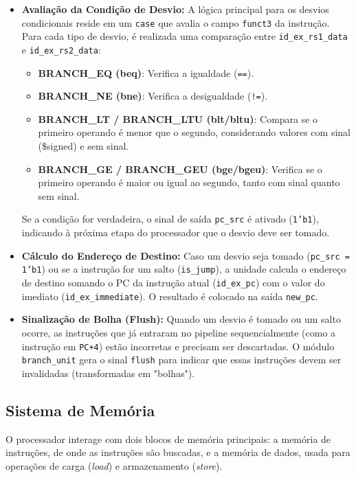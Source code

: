\documentclass[12pt]{article}
\begin{document}
\begin{itemize}
    \item \textbf{Avaliação da Condição de Desvio:} A lógica principal para os desvios condicionais reside em um \texttt{case} que avalia o campo \texttt{funct3} da instrução. Para cada tipo de desvio, é realizada uma comparação entre \texttt{id\_ex\_rs1\_data} e \texttt{id\_ex\_rs2\_data}:
    \begin{itemize}
        \item \textbf{BRANCH\_EQ (beq)}: Verifica a igualdade (\texttt{==}).
        \item \textbf{BRANCH\_NE (bne)}: Verifica a desigualdade (\texttt{!=}).
        \item \textbf{BRANCH\_LT / BRANCH\_LTU (blt/bltu)}: Compara se o primeiro operando é menor que o segundo, considerando valores com sinal (\$signed) e sem sinal.
        \item \textbf{BRANCH\_GE / BRANCH\_GEU (bge/bgeu)}: Verifica se o primeiro operando é maior ou igual ao segundo, tanto com sinal quanto sem sinal.
    \end{itemize}
    Se a condição for verdadeira, o sinal de saída \texttt{pc\_src} é ativado (\texttt{1'b1}), indicando à próxima etapa do processador que o desvio deve ser tomado.

    \item \textbf{Cálculo do Endereço de Destino:} Caso um desvio seja tomado (\texttt{pc\_src = 1'b1}) ou se a instrução for um salto (\texttt{is\_jump}), a unidade calcula o endereço de destino somando o PC da instrução atual (\texttt{id\_ex\_pc}) com o valor do imediato (\texttt{id\_ex\_immediate}). O resultado é colocado na saída \texttt{new\_pc}.

    \item \textbf{Sinalização de Bolha (Flush):} Quando um desvio é tomado ou um salto ocorre, as instruções que já entraram no pipeline sequencialmente (como a instrução em \texttt{PC+4}) estão incorretas e precisam ser descartadas. O módulo \texttt{branch\_unit} gera o sinal \texttt{flush} para indicar que essas instruções devem ser invalidadas (transformadas em "bolhas").

\end{itemize}

\subsection{Sistema de Memória}
O processador interage com dois blocos de memória principais: a memória de instruções, de onde as instruções são buscadas, e a memória de dados, usada para operações de carga (\textit{load}) e armazenamento (\textit{store}).
\end{document}
